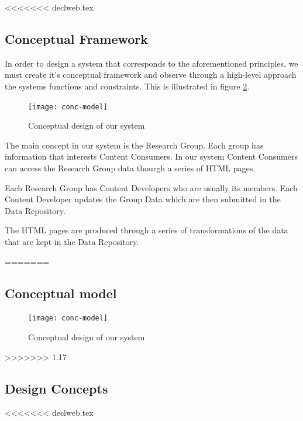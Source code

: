 \documentclass[10pt]{article}
\begin{document}
<<<<<<< declweb.tex
\subsection{Conceptual Framework}

In order to design a system that corresponds to the aforementioned principles, 
we must create it's conceptual framework and observe through a high-level
approach the systems functions and constraints. This is illustrated 
in figure \ref{fig:conc-model}.

\begin{figure}[h!]
\begin{center}
\texttt{[image: conc-model]}
\end{center}
\caption{Conceptual design of our system}
\label{fig:conc-model}
\end{figure}

The main concept in our system is the {\sc Research Group}. Each group has 
information that interests {\sc Content Consumers}. In our system {\sc Content Consumers} 
can access the {\sc Research Group} data thourgh a series of {\sc HTML pages}.

Each {\sc Research Group} has {\sc Content Developers} who are usually its members. Each 
{\sc Content Developer} updates the {\sc Group Data} which are then submitted in the 
{\sc Data Repository}.

The {\sc HTML pages} are produced through a series of transformations of the data that
are kept in the {\sc Data Repository}.



=======
\subsection{Conceptual model}

\begin{figure}[h!]
\begin{center}
\texttt{[image: conc-model]}
\end{center}
\caption{Conceptual design of our system}
\label{fig:conc-model}
\end{figure}

>>>>>>> 1.17
\subsection{Design Concepts}
<<<<<<< declweb.tex
\end{document}
